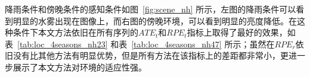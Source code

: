 
降雨条件和傍晚条件的感知条件如图~\ref{fig:scene_nh} 所示，左图的降雨条件可以看到明显的水雾出现在图像上，而右图的傍晚环境，可以看到明显的亮度降低。在这种条件下本文方法依旧在所有序列的$ATE_t$和$RPE_t$指标上取得了最好的效果，如表~\ref{tab:loc_4seasons_nh23} 和表~\ref{tab:loc_4seasons_nh47} 所示；虽然在$RPE_r$依旧没有比其他方法有明显优势，但是所有方法在该指标上的差距都非常小，更进一步展示了本文方法对环境的适应性强。

